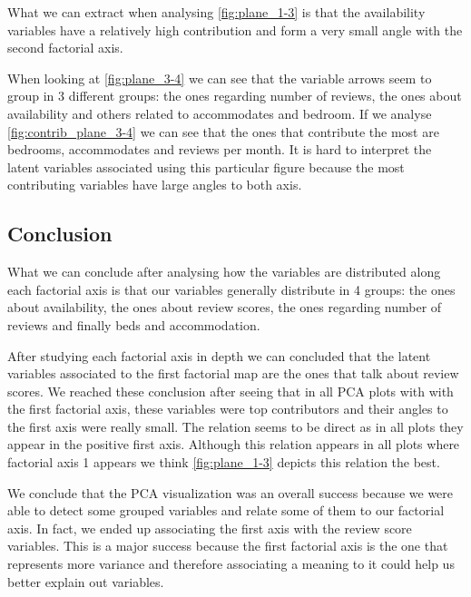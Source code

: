 




What we can extract when analysing \cref{fig:plane_1-3} is that the availability variables have 
a relatively high contribution and form a very small angle with the second factorial axis.


When looking at \cref{fig:plane_3-4} we can see that the variable arrows seem to group in 3 different groups: the ones regarding number of reviews, the ones about availability and others related to accommodates and bedroom. If we analyse \cref{fig:contrib_plane_3-4} we can see that the ones that contribute the most are bedrooms, accommodates 
and reviews per month. It is hard to interpret the latent variables associated using this particular figure because the most contributing variables have large angles to both axis.


\begin{landscape}


\subsection{Conclusion}%
What we can conclude after analysing how the variables are distributed along each factorial axis is 
that our variables generally distribute in 4 groups: the ones about availability, 
the ones about review scores, the ones regarding number of reviews and finally beds and accommodation.

After studying each factorial axis in depth we can concluded that the latent variables associated to 
the first factorial map are the ones that talk about review scores. We reached these conclusion after
seeing that in all PCA plots with with the first factorial axis, these variables were top contributors
and their angles to the first axis were really small. The relation seems to be direct as in all plots 
they appear in the positive first axis. Although this relation appears in all plots where factorial
axis 1 appears we think \cref{fig:plane_1-3} depicts this relation the best. 

We conclude that the PCA visualization was an overall success because we were able to detect some grouped
variables and relate some of them to our factorial axis. In fact, we ended up associating the first axis
with the review score variables. This is a major success because the first factorial axis is the one
that represents more variance and therefore associating a meaning to it could help us better explain
out variables.

\end{landscape}

